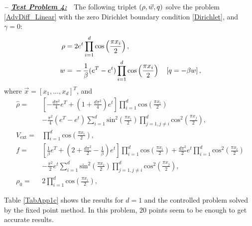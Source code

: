 \textbf{\emph{-- \underline{Test Problem 4:}}}~~The following triplet $(\rho,\vec{w},q)$ solve the problem \eqref{AdvDiff_Linear} with the zero Dirichlet boundary condition \eqref{Dirichlet}, and $\gamma =0$:
\begin{align*}
\ \rho={}&2e^{t}\prod_{i=1}^{d}\text{cos}\left(\frac{\pi{}x_i}{2}\right), \\
\ w={}&-\frac{1}{\beta}(e^{T}-e^{t})\prod_{i=1}^{d}\text{cos}\left(\frac{\pi{}x_i}{2}\right)\quad\left[\adj=-\beta{}w\right],
\end{align*}
where $\vec{x}=[x_1,...,x_d]^T$, and
\begin{align*}
\ \widehat{\rho}={}&\left[-\frac{d\pi^2}{4}e^{T}+\left(1+\frac{d\pi^2}{4}\right)e^{t}\right]\prod_{i=1}^{d}\text{cos}\left(\frac{\pi{}x_i}{2}\right) \\
\ &-\frac{\pi^2}{4}(e^{T}-e^{t})\sum_{i=1}^{d}\text{sin}^2\left(\frac{\pi{}x_i}{2}\right)\prod_{j=1,j\neq{}i}^{d}\text{cos}^2\left(\frac{\pi{}x_j}{2}\right), \\
\ V_{\text{ext}}={}&\prod_{i=1}^{d}\text{cos}\left(\frac{\pi{}x_i}{2}\right), \\
\ f={}&\left[\frac{1}{\beta}e^{T}+\left(2+\frac{d\pi^2}{2}-\frac{1}{\beta}\right)e^{t}\right]\prod_{i=1}^{d}\text{cos}\left(\frac{\pi{}x_i}{2}\right)+\frac{d\pi^{2}}{2}e^{t}\prod_{i=1}^{d}\text{cos}^2\left(\frac{\pi{}x_i}{2}\right) \\
\ &-\frac{\pi^2}{2}e^{t}\sum_{i=1}^{d}\text{sin}^2\left(\frac{\pi{}x_i}{2}\right)\prod_{j=1,j\neq{}i}^{d}\text{cos}^2\left(\frac{\pi{}x_j}{2}\right), \\
\ \rho_{0}={}&2\prod_{i=1}^{d}\text{cos}\left(\frac{\pi{}x_i}{2}\right),
\end{align*}

Table \ref{TabApp1c} shows the results for $d=1$ and the controlled problem solved by the fixed point method. In this problem, $20$ points seem to be enough to get accurate results.

